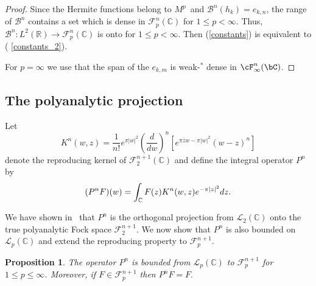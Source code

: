 \documentclass[12pt]{amsart}
\theoremstyle{plain}
\newtheorem{proposition}{Proposition}
\numberwithin{equation}{section}
\begin{document}
\begin{proof}
Since the Hermite functions belong to $M^{p}$\ and $\mathcal{B}%
^{n}(h_{k})=e_{k,n}$, the range of $\mathcal{B}^{n}$ contains a set which is
dense in $\mathcal{F}_{p}^{n}(%
\mathbb{C}
)$ for $1\leq p < \infty$. Thus, $\mathcal{B}^{n}:L^{2}(%
\mathbb{R}
)\rightarrow \mathcal{F}_{p}^{n}(%
\mathbb{C}
)$ is onto for $1\leq p < \infty$. Then (\ref{constants}) is equivalent to (%
\ref{constants_2}).

For $p=\infty $ we use that the span of the $e_{k,m}$ is weak-$^*$ dense in $%
\cF ^n_\infty (\bC )$.
\end{proof}

\subsection{The polyanalytic projection}

Let 
\begin{equation*}
K^{n}(w,z)=\frac{1}{n!}e^{\pi \left\vert w\right\vert ^{2}}\left( \frac{d}{dw%
}\right) ^{n}\left[ e^{\pi \overline{z}w-\pi \left\vert w\right\vert
^{2}}(w-z)^{n}\right]
\end{equation*}%
denote the reproducing kernel of $\mathcal{F}_{2}^{n+1}(%
\mathbb{C}
)$ and define the integral operator $P^{n}$ by 
\begin{equation*}
(P^{n}F)(w)=\int_{%
\mathbb{C}
}F(z)K^{n}(w,z)e^{-\pi \left\vert z\right\vert ^{2}}dz\text{.}
\end{equation*}

We have shown in~\cite{Abreustructure} that $P^{n}$ is the orthogonal
projection from $\mathcal{L}_{2}(%
\mathbb{C}
)$ onto the true polyanalytic Fock space $\mathcal{F}_{2}^{n+1}$. We now
show that $P^{n}$ is also bounded on $\mathcal{L}_{p}(%
\mathbb{C}
)$ and extend the reproducing property to $\mathcal{F}_{p}^{n+1}$.

\begin{proposition}
The operator $P^{n}$ is bounded from $\mathcal{L}_{p}(%
\mathbb{C}
)$ to $\mathcal{F}_{p}^{n+1}$ for $1\leq p\leq \infty $. Moreover, if $F\in 
\mathcal{F}_{p}^{n+1}$ then $P^{n}F=F.$
\end{proposition}
\end{document}
